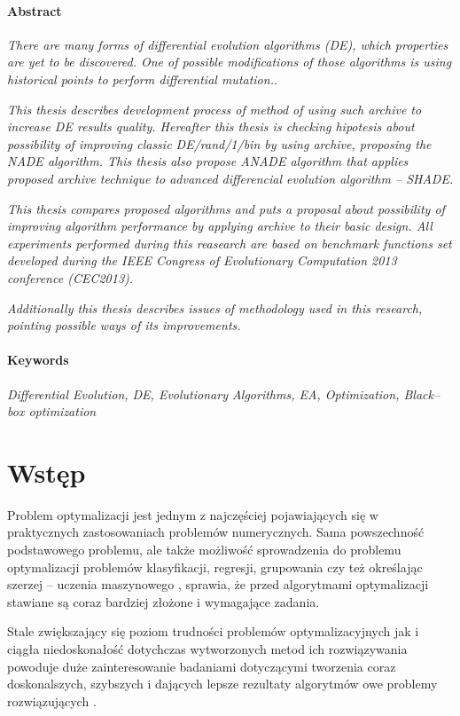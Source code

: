 \documentclass[12pt,a4paper]{report}
\begin{document}
\subsubsection{Abstract}
\par{
\emph{There are many forms of differential evolution algorithms (DE), which properties are yet to be discovered. One of possible modifications of those algorithms is using historical points to perform differential mutation.}.
}
\par{
\emph{
This thesis describes development process of method of using such archive to increase DE results quality. Hereafter this thesis is checking hipotesis about possibility of improving classic \emph{DE/rand/1/bin} by using archive, proposing the \emph{NADE} algorithm. This thesis also propose \emph{ANADE} algorithm that applies proposed archive technique to advanced differencial evolution algorithm -- \emph{SHADE}.
}
}
\par{
\emph{
This thesis compares proposed algorithms and puts a proposal about possibility of improving algorithm performance by applying archive to their basic design.
All experiments performed during this reasearch are based on benchmark functions set developed during the \emph{IEEE Congress of Evolutionary Computation 2013 conference (CEC2013)}.
}
}
\par{
\emph{
Additionally this thesis describes issues of methodology used in this research, pointing possible ways of its improvements.
}
}
\subsubsection{Keywords}
\par{
\emph{Differential Evolution, DE, Evolutionary Algorithms, EA, Optimization, Black--box optimization}
}


\chapter{Wstęp}
\par{
Problem optymalizacji jest jednym z najczęściej pojawiających się w praktycznych zastosowaniach problemów numerycznych. Sama powszechność podstawowego problemu, ale także możliwość sprowadzenia do problemu optymalizacji problemów klasyfikacji, regresji, grupowania czy też określając szerzej -- uczenia maszynowego \cite{SpringerIntroToEvol,SearchingInteligent,ArchivedDE}, sprawia, że przed algorytmami optymalizacji stawiane są coraz bardziej złożone i wymagające zadania.
}
\par{
Stale zwiększający się poziom trudności problemów optymalizacyjnych jak i ciągła niedoskonałość dotychczas wytworzonych metod ich rozwiązywania powoduje duże zainteresowanie badaniami dotyczącymi tworzenia coraz doskonalszych, szybszych i dających lepsze rezultaty algorytmów owe problemy rozwiązujących \cite{StateOfArt}.
}
\end{document}
